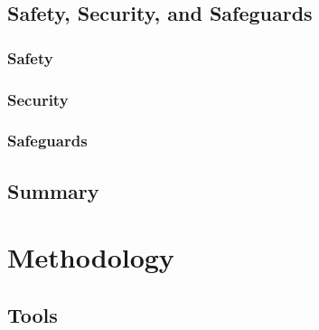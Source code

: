 \section{Safety, Security, and Safeguards}

\subsection{Safety}
\label{sec:safety}



%

\subsection{Security}
\label{sec:security}


\subsection{Safeguards}
\label{sec:safeguards}


\section{Summary}
\label{sec:backgroundsummary}





\chapter{Methodology}

\section{Tools}




